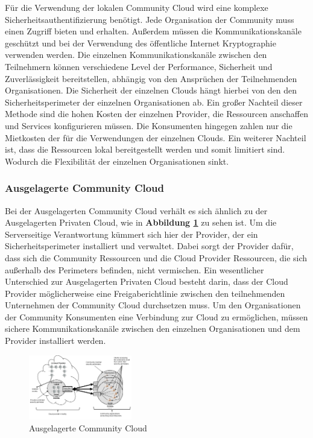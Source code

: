Für die Verwendung der lokalen Community Cloud wird eine komplexe Sicherheitsauthentifizierung benötigt. Jede Organisation der Community muss einen Zugriff bieten und erhalten.
Außerdem müssen die Kommunikationskanäle geschützt und bei der Verwendung des öffentliche Internet Kryptographie verwenden werden. Die einzelnen Kommunikationskanäle zwischen den Teilnehmern 
können verschiedene Level der Performance, Sicherheit und Zuverlässigkeit bereitstellen, abhängig von den Ansprüchen der Teilnehmenden Organisationen. Die Sicherheit der einzelnen Clouds hängt 
hierbei von den den Sicherheitsperimeter der einzelnen Organisationen ab. Ein großer Nachteil dieser Methode sind die hohen Kosten der einzelnen Provider, die Ressourcen 
anschaffen und Services konfigurieren müssen. Die Konsumenten hingegen zahlen nur die Mietkosten der für die Verwendungen der einzelnen Clouds. Ein weiterer Nachteil ist, dass 
die Ressourcen lokal bereitgestellt werden und somit limitiert sind. Wodurch die Flexibilität der einzelnen Organisationen sinkt.

\subsubsection{Ausgelagerte Community Cloud}

Bei der Ausgelagerten Community Cloud verhält es sich ähnlich zu der Ausgelagerten Privaten Cloud, wie in \textbf{Abbildung \ref{OutSourcedCommunityCloud}} zu sehen ist.
Um die Serverseitige Verantwortung kümmert sich hier der Provider, der ein Sicherheitsperimeter installiert und verwaltet. Dabei sorgt der Provider dafür, dass sich 
die Community Ressourcen und die Cloud Provider Ressourcen, die sich außerhalb des Perimeters befinden, nicht vermischen. Ein wesentlicher Unterschied zur Ausgelagerten Privaten Cloud
besteht darin, dass der Cloud Provider möglicherweise eine Freigaberichtlinie zwischen den teilnehmenden Unternehmen der Community Cloud durchsetzen muss. 
Um den Organisationen der Community Konsumenten eine Verbindung zur Cloud zu ermöglichen, müssen sichere Kommunikationskanäle zwischen den einzelnen Organisationen und 
dem Provider installiert werden. 

\begin{figure}[H]
    \centering
	\includegraphics[width=0.4\textwidth]{Images/OutSourcedCommunityCloud}
	\caption{Ausgelagerte Community Cloud \cite{Badger}}
	\label{OutSourcedCommunityCloud}
\end{figure}

